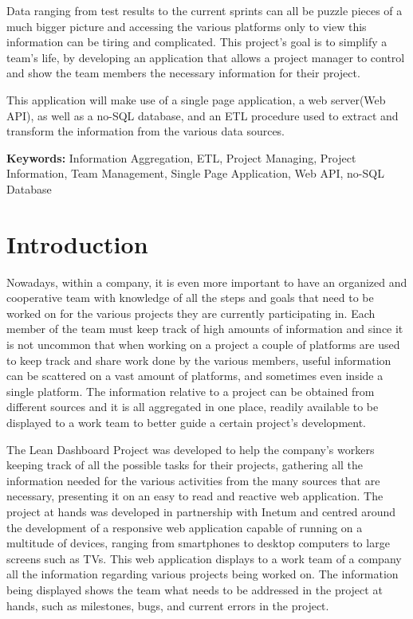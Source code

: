 \documentclass[a4paper,twoside,10pt]{report}
\begin{document}
Data ranging from test results to the current sprints can all be puzzle pieces of a much bigger picture and accessing the various platforms only to view this information can be tiring and complicated. This project's goal is to simplify a team's life, by developing an application that allows a project manager to control and show the team members the necessary information for their project.

This application will make use of a single page application, a web server(Web API), as well as a no-SQL database, and an ETL procedure used to extract and transform the information from the various data sources.


\textbf{Keywords:} Information Aggregation, ETL, Project Managing, Project Information, Team Management, Single Page Application, Web API, no-SQL Database


\newpage
\tableofcontents{}
\newpage

\chapter{Introduction}

Nowadays, within a company, it is even more important to have an organized and cooperative team with knowledge of all the steps and goals that need to be worked on for the various projects they are currently participating in.
Each member of the team must keep track of high amounts of information and since it is not uncommon that when working on a project a couple of platforms are used to keep track and share work done by the various members, useful information can be scattered on a vast amount of platforms, and sometimes even inside a single platform.
The information relative to a project can be obtained from different sources and it is all aggregated in one place, readily available to be displayed to a work team to better guide a certain project's development.

The Lean Dashboard Project was developed to help the company's workers keeping track of all the possible tasks for their projects, gathering all the information needed for the various activities from the many sources that are necessary, presenting it on an easy to read and reactive web application.
The project at hands was developed in partnership with Inetum\cite{INETUM} and centred around the development of a responsive web application capable of running on a multitude of devices, ranging from smartphones to desktop computers to large screens such as TVs. This web application displays to a work team of a company all the information regarding various projects being worked on. 
The information being displayed shows the team what needs to be addressed in the project at hands, such as milestones, bugs, and current errors in the project.
\end{document}
